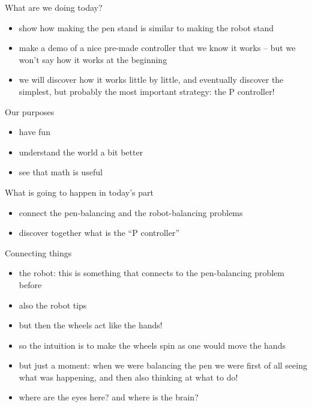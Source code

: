 \begin{frame}{What are we doing today?}
	\begin{itemize}
		\item show how making the pen stand is similar to making the robot stand
		\item make a demo of a nice pre-made controller that we know it works -- but we won't say how it works at the beginning
		\item we will discover how it works little by little, and eventually discover the simplest, but probably the most important strategy: the P controller!
	\end{itemize}
\end{frame}


\begin{frame}{Our purposes}
	\pause
	\begin{itemize}
		\item have fun
		\pause
		\item understand the world a bit better
		\pause
		\item see that math is useful
	\end{itemize}
\end{frame}


\begin{frame}{What is going to happen in today's part}
	\pause
	\begin{itemize}
		\item connect the pen-balancing and the robot-balancing problems
		\pause
		\item discover together what is the ``P controller''
	\end{itemize}
\end{frame}


\begin{frame}{Connecting things}
	\begin{itemize}
		\item the robot: this is something that connects to the pen-balancing problem before
		\item also the robot tips
		\item but then the wheels act like the hands!
		\item so the intuition is to make the wheels spin as one would move the hands
		\item but just a moment: when we were balancing the pen we were first of all seeing what was happening, and then also thinking at what to do!
		\item where are the eyes here? and where is the brain?
	\end{itemize}
\end{frame}


